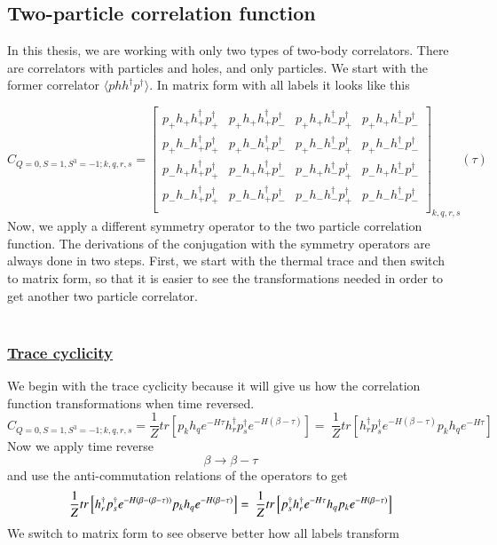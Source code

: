 \subsection{Two-particle correlation function}
\label{ssec:sym-twobody}
In this thesis, we are working with only two types of two-body correlators. There are correlators with particles and holes, and only particles. We start with the former correlator $\langle phh^\dagger p^\dagger\rangle$. In matrix form with all labels it looks like this

\newcommand{\cor}[4]{p_{#1}h_{#2}h^\dagger_{#3}p^\dagger_{#4}}
\begin{equation}
  C_{Q=0,S=1,S^3=-1;k,q,r,s} =
  \left[
  \begin{array}{cccc}
    \cor{+}{+}{+}{+} & \cor{+}{+}{+}{-} & \cor{+}{+}{-}{+} & \cor{+}{+}{-}{-} \\
    \cor{+}{-}{+}{+} & \cor{+}{-}{+}{-} & \cor{+}{-}{-}{+} & \cor{+}{-}{-}{-} \\
    \cor{-}{+}{+}{+} & \cor{-}{+}{+}{-} & \cor{-}{+}{-}{+} & \cor{-}{+}{-}{-} \\
    \cor{-}{-}{+}{+} & \cor{-}{-}{+}{-} & \cor{-}{-}{-}{+} & \cor{-}{-}{-}{-} \\
  \end{array}
  \right]_{k,q,r,s} (\tau)
  \label{eq:phhpmat}
\end{equation}
Now, we apply a different symmetry operator to the two particle correlation function. The derivations of the conjugation with the symmetry operators are always done in two steps. First, we start with the thermal trace and then switch to matrix form, so that it is easier to see the transformations needed in order to get another two particle correlator.
\\
\\
\subsubsection{\underline{Trace cyclicity}}
We begin with the trace cyclicity because it will give us how the correlation function transformations when time reversed.
\\
\begin{equation}
  C_{Q=0,S=1,S^3=-1;k,q,r,s} = \frac{1}{Z}tr\left[p_kh_qe^{-H\tau}h^\dagger_rp^\dagger_se^{-H\left(\beta-\tau\right)}\right] =\
  \frac{1}{Z}tr\left[h^\dagger_rp^\dagger_se^{-H\left(\beta-\tau\right)}p_kh_qe^{-H\tau}\right]
\end{equation}
Now we apply time reverse
$$\beta \rightarrow \beta - \tau$$
and use the anti-commutation relations of the operators to get
\begin{equation}
  \frac{1}{Z}tr\left[h^\dagger_rp^\dagger_se^{-H\left(\beta-\left(\beta-\tau\right)\right)}p_kh_qe^{-H\left(\beta-\tau\right)}\right]=\\\
  \frac{1}{Z}tr\left[p^\dagger_sh^\dagger_re^{-H\tau}h_qp_ke^{-H\left(\beta-\tau\right)}\right]
\end{equation}
We switch to matrix form to see observe better how all labels transform


